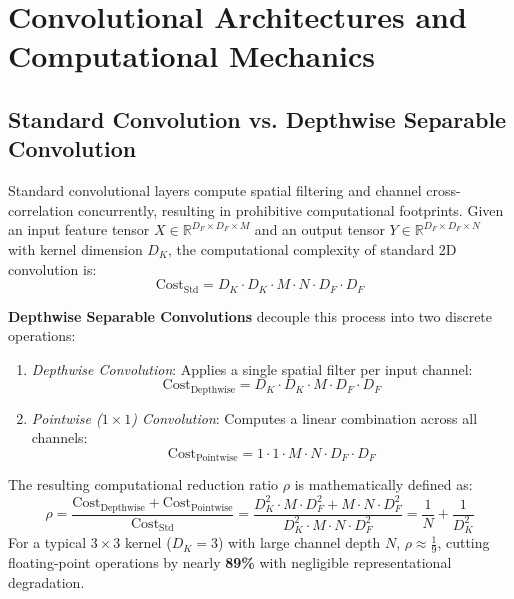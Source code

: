 \documentclass[11pt,a4paper]{article}
\begin{document}
\section{Convolutional Architectures and Computational Mechanics}

\subsection{Standard Convolution vs. Depthwise Separable Convolution}
Standard convolutional layers compute spatial filtering and channel cross-correlation concurrently, resulting in prohibitive computational footprints. Given an input feature tensor $X \in \mathbb{R}^{D_F \times D_F \times M}$ and an output tensor $Y \in \mathbb{R}^{D_F \times D_F \times N}$ with kernel dimension $D_K$, the computational complexity of standard 2D convolution is:
\begin{equation}
    \text{Cost}_{\text{Std}} = D_K \cdot D_K \cdot M \cdot N \cdot D_F \cdot D_F
\end{equation}

\textbf{Depthwise Separable Convolutions} decouple this process into two discrete operations:
\begin{enumerate}
    \item \textit{Depthwise Convolution}: Applies a single spatial filter per input channel:
    \begin{equation}
        \text{Cost}_{\text{Depthwise}} = D_K \cdot D_K \cdot M \cdot D_F \cdot D_F
    \end{equation}
    \item \textit{Pointwise ($1\times 1$) Convolution}: Computes a linear combination across all channels:
    \begin{equation}
        \text{Cost}_{\text{Pointwise}} = 1 \cdot 1 \cdot M \cdot N \cdot D_F \cdot D_F
    \end{equation}
\end{enumerate}

The resulting computational reduction ratio $\rho$ is mathematically defined as:
\begin{equation}
    \rho = \frac{\text{Cost}_{\text{Depthwise}} + \text{Cost}_{\text{Pointwise}}}{\text{Cost}_{\text{Std}}} = \frac{D_K^2 \cdot M \cdot D_F^2 + M \cdot N \cdot D_F^2}{D_K^2 \cdot M \cdot N \cdot D_F^2} = \frac{1}{N} + \frac{1}{D_K^2}
\end{equation}
For a typical $3 \times 3$ kernel ($D_K = 3$) with large channel depth $N$, $\rho \approx \frac{1}{9}$, cutting floating-point operations by nearly \textbf{89\%} with negligible representational degradation.
\end{document}
